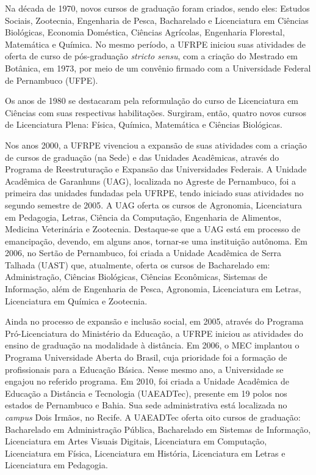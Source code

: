 Na década de 1970, novos cursos de graduação foram criados, sendo eles: Estudos Sociais, Zootecnia, Engenharia de Pesca, Bacharelado e Licenciatura em Ciências Biológicas, Economia Doméstica, Ciências Agrícolas, Engenharia Florestal, Matemática e Química. No mesmo período, a UFRPE iniciou suas atividades de oferta de curso de pós-graduação \textit{stricto sensu}, com a criação do Mestrado em Botânica, em 1973, por meio de um convênio firmado com a Universidade Federal de Pernambuco (UFPE).

Os anos de 1980 se destacaram pela reformulação do curso de Licenciatura em Ciências com suas respectivas habilitações. Surgiram, então, quatro novos cursos de Licenciatura Plena: Física, Química, Matemática e Ciências Biológicas.

Nos anos 2000, a UFRPE vivenciou a expansão de suas atividades com a criação de cursos de graduação (na Sede) e das Unidades Acadêmicas, através do Programa de Reestruturação e Expansão das Universidades Federais. A Unidade Acadêmica de Garanhuns (UAG), localizada no Agreste de Pernambuco, foi a primeira das unidades fundadas pela UFRPE, tendo iniciado suas atividades no segundo semestre de 2005. A UAG oferta os cursos de Agronomia, Licenciatura em Pedagogia, Letras, Ciência da Computação, Engenharia de Alimentos, Medicina Veterinária e Zootecnia. Destaque-se que a UAG está em processo de emancipação, devendo, em alguns anos, tornar-se uma instituição autônoma. Em 2006, no Sertão de Pernambuco, foi criada a Unidade Acadêmica de Serra Talhada (UAST) que, atualmente, oferta os cursos de Bacharelado em: Administração, Ciências Biológicas, Ciências Econômicas, Sistemas de Informação, além de Engenharia de Pesca, Agronomia, Licenciatura em Letras, Licenciatura em Química e Zootecnia.

Ainda no processo de expansão e inclusão social, em 2005, através do Programa Pró-Licenciatura do Ministério da Educação, a UFRPE iniciou as atividades do ensino de graduação na modalidade à distância. Em 2006, o MEC implantou o Programa Universidade Aberta do Brasil, cuja prioridade foi a formação de profissionais para a Educação Básica. Nesse mesmo ano, a Universidade se engajou no referido programa. Em 2010, foi criada a Unidade Acadêmica de Educação a Distância e Tecnologia (UAEADTec), presente em 19 polos nos estados de Pernambuco e Bahia. Sua sede administrativa está localizada no \textit{campus} Dois Irmãos, no Recife. A UAEADTec oferta oito cursos de graduação: Bacharelado em Administração Pública, Bacharelado em Sistemas de Informação, Licenciatura em Artes Visuais Digitais, Licenciatura em Computação, Licenciatura em Física, Licenciatura em História, Licenciatura em Letras e Licenciatura em Pedagogia.

